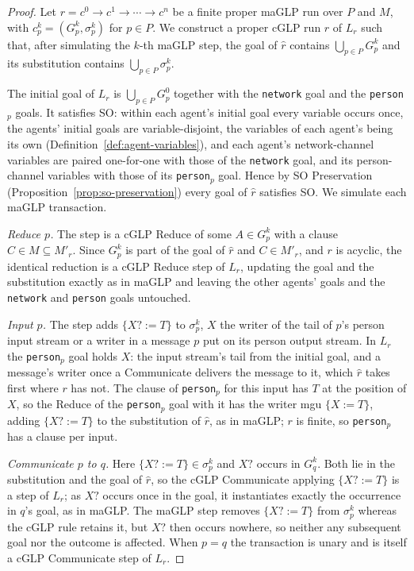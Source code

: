 \propMaGLPDeduction*

\begin{proof}
Let $r = c^0 \rightarrow c^1 \rightarrow \cdots \rightarrow c^n$ be a finite proper maGLP run over $P$ and $M$, with $c^k_p = (G^k_p, \sigma^k_p)$ for $p \in P$. We construct a proper cGLP run $\hat r$ of $L_r$ such that, after simulating the $k$-th maGLP step, the goal of $\hat r$ contains $\bigcup_{p \in P} G^k_p$ and its substitution contains $\bigcup_{p \in P} \sigma^k_p$.

The initial goal of $L_r$ is $\bigcup_{p \in P} G^0_p$ together with the \verb|network| goal and the \verb|person|$_p$ goals. It satisfies SO: within each agent's initial goal every variable occurs once, the agents' initial goals are variable-disjoint, the variables of each agent's being its own (Definition~\ref{def:agent-variables}), and each agent's network-channel variables are paired one-for-one with those of the \verb|network| goal, and its person-channel variables with those of its \verb|person|$_p$ goal. Hence by SO Preservation (Proposition~\ref{prop:so-preservation}) every goal of $\hat r$ satisfies SO. We simulate each maGLP transaction.

\emph{Reduce $p$.} The step is a cGLP Reduce of some $A \in G^k_p$ with a clause $C \in M \subseteq M'_r$. Since $G^k_p$ is part of the goal of $\hat r$ and $C \in M'_r$, and $r$ is acyclic, the identical reduction is a cGLP Reduce step of $L_r$, updating the goal and the substitution exactly as in maGLP and leaving the other agents' goals and the \verb|network| and \verb|person| goals untouched.

\emph{Input $p$.} The step adds $\{X? := T\}$ to $\sigma^k_p$, $X$ the writer of the tail of $p$'s person input stream or a writer in a message $p$ put on its person output stream. In $L_r$ the \verb|person|$_p$ goal holds $X$: the input stream's tail from the initial goal, and a message's writer once a Communicate delivers the message to it, which $\hat r$ takes first where $r$ has not. The clause of \verb|person|$_p$ for this input has $T$ at the position of $X$, so the Reduce of the \verb|person|$_p$ goal with it has the writer mgu $\{X := T\}$, adding $\{X? := T\}$ to the substitution of $\hat r$, as in maGLP; $r$ is finite, so \verb|person|$_p$ has a clause per input.

\emph{Communicate $p$ to $q$.} Here $\{X? := T\} \in \sigma^k_p$ and $X?$ occurs in $G^k_q$. Both lie in the substitution and the goal of $\hat r$, so the cGLP Communicate applying $\{X? := T\}$ is a step of $L_r$; as $X?$ occurs once in the goal, it instantiates exactly the occurrence in $q$'s goal, as in maGLP. The maGLP step removes $\{X? := T\}$ from $\sigma^k_p$ whereas the cGLP rule retains it, but $X?$ then occurs nowhere, so neither any subsequent goal nor the outcome is affected. When $p = q$ the transaction is unary and is itself a cGLP Communicate step of $L_r$.


\end{proof}
